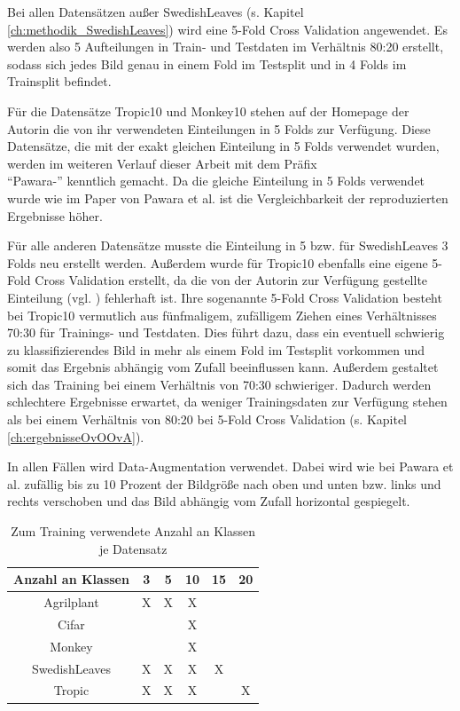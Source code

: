 Bei allen Datensätzen außer SwedishLeaves (s. Kapitel \ref{ch:methodik_SwedishLeaves}) wird eine 5-Fold Cross Validation angewendet. Es werden also 5 Aufteilungen in Train- und Testdaten im Verhältnis 80:20 erstellt, sodass sich jedes Bild genau in einem Fold im Testsplit und in 4 Folds im Trainsplit befindet.

Für die Datensätze Tropic10 und Monkey10 stehen auf der Homepage der Autorin \cite{pawaraWebsiteDatensaetze} die von ihr verwendeten Einteilungen in 5 Folds zur Verfügung. Diese Datensätze, die mit der exakt gleichen Einteilung in 5 Folds verwendet wurden, werden im weiteren Verlauf dieser Arbeit mit dem Präfix\\ \enquote{Pawara-} kenntlich gemacht. Da die gleiche Einteilung in 5 Folds verwendet wurde wie im Paper von Pawara et al. \cite{pawaraPaper} ist die Vergleichbarkeit der reproduzierten Ergebnisse höher.

Für alle anderen Datensätze musste die Einteilung in 5 bzw. für SwedishLeaves 3 Folds neu erstellt werden.
Außerdem wurde für Tropic10 ebenfalls eine eigene 5-Fold Cross Validation erstellt, da die von der Autorin zur Verfügung gestellte Einteilung (vgl. \cite{pawaraWebsiteDatensaetze}) fehlerhaft ist. Ihre sogenannte 5-Fold Cross Validation besteht bei Tropic10 vermutlich aus fünfmaligem, zufälligem Ziehen eines Verhältnisses 70:30 für Trainings- und Testdaten. Dies führt dazu, dass ein eventuell schwierig zu klassifizierendes Bild in mehr als einem Fold im Testsplit vorkommen und somit das Ergebnis abhängig vom Zufall beeinflussen kann. Außerdem gestaltet sich das Training bei einem Verhältnis von 70:30 schwieriger. Dadurch werden schlechtere Ergebnisse erwartet, da weniger Trainingsdaten zur Verfügung stehen als bei einem Verhältnis von 80:20 bei 5-Fold Cross Validation (s. Kapitel \ref{ch:ergebnisseOvOOvA}).


In allen Fällen wird Data-Augmentation verwendet. Dabei wird wie bei Pawara et al. \cite{pawaraPaper, pawaraWebsiteCode} zufällig bis zu 10 Prozent der Bildgröße nach oben und unten bzw. links und rechts verschoben und das Bild abhängig vom Zufall horizontal gespiegelt.

\begin{table}[H]
\centering
\begin{tabular}{|c|c|c|c|c|c|}
\hline 
Anzahl an Klassen & 3 & 5 & 10 & 15 & 20 \\ 
\hline 
Agrilplant & X & X & X &  &  \\ 
Cifar &  &  & X &  &  \\ 
Monkey &  &  & X &  &  \\ 
SwedishLeaves & X & X & X & X &  \\ 
Tropic & X & X & X & & X \\ 
\hline 
\end{tabular} 
\caption{Zum Training verwendete Anzahl an Klassen je Datensatz}
\label{fig:DatensatzKlassen}
\end{table}
